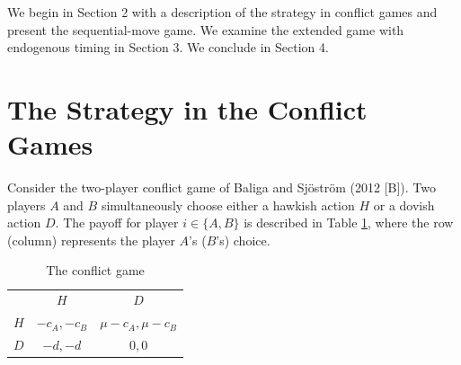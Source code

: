 \documentclass[12pt,english]{article}
\begin{document}
We begin in Section 2 with a description of the strategy in conflict games and present the sequential-move game. We examine the extended game with endogenous timing in Section 3. We conclude in Section 4.\par 

\section{The Strategy in the Conflict Games}
Consider the two-player conflict game of Baliga and Sj\"ostr\"om (2012 [B]). Two players $A$ and $B$ simultaneously choose either a hawkish action $H$ or a dovish action $D$. The payoff for player $i \in \{A,B\}$ is described in Table \ref{t:payoff}, where the row (column) represents the player $A$'s ($B$'s) choice.

\begin{center}
\begin{table}[h!]
\centering
\begin{tabular}{ccc}
  & $H$  & $D$  \\
$H$ & $-c_A, -c_B$ & $\mu-c_A, \mu-c_B$ \\
$D$ & $-d,-d$ & $0,0$ 
\end{tabular}   
\caption{The conflict game} 
\label{t:payoff}
\end{table}
\end{center}\par
\end{document}

